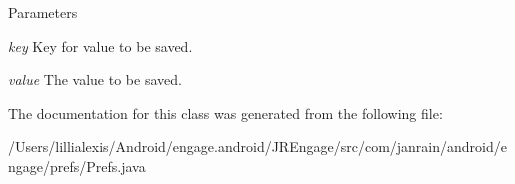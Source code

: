 \begin{DoxyParams}{Parameters}
\item[{\em key}]Key for value to be saved. \item[{\em value}]The value to be saved. \end{DoxyParams}


The documentation for this class was generated from the following file:\begin{DoxyCompactItemize}
\item 
/Users/lillialexis/Android/engage.android/JREngage/src/com/janrain/android/engage/prefs/Prefs.java\end{DoxyCompactItemize}
